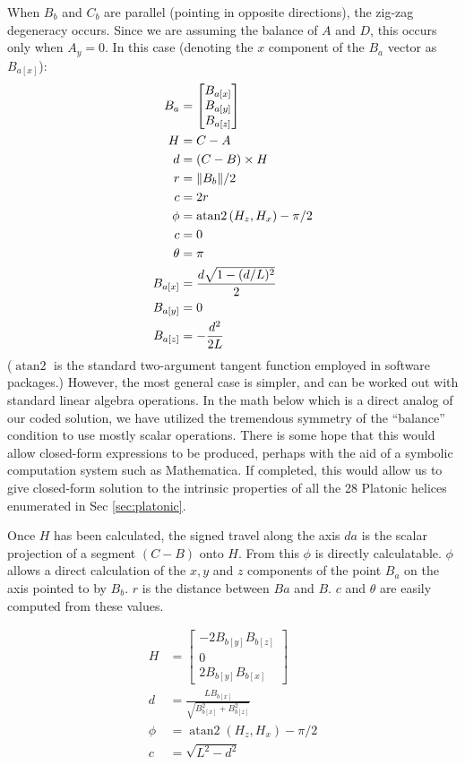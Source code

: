 \documentclass[11pt]{article}
\DeclarePairedDelimiter{\norm}{\lVert}{\rVert}
\DeclareMathOperator{\atantwo}{atan2}
\begin{document}
{When $B_b$ and $C_b$ are parallel (pointing in opposite directions),
the zig-zag degeneracy occurs. Since we are assuming
the balance of $A$ and $D$, this occurs only when $A_y = 0$.
In this case (denoting the $x$ component of the $B_a$ vector as $B_{a[x]}$):
\begin{align}
  B_{a} &= \begin{bmatrix} B_{a[x]} \\ B_{a[y]} \\ B_{a[z]}  \end{bmatrix} \\
  H &=  C - A \\
  d &= (C - B) \times H \\
  r &= \norm{B_b} / 2 \\
  c &= 2 r\\
  \phi &= \atantwo{(H_z,H_x)} - \pi/2 \\
  c &= 0 \\
  \theta &= \pi \\
  B_{a[x]} &= \frac{d\sqrt{1 - (d/L)^2}}{2} \\
  B_{a[y]} &= 0 \\
  B_{a[z]} &= -\frac{d^2}{2L} \\
\end{align}
($\atantwo$ is the standard two-argument tangent function employed in software packages.)
However, the most general case is simpler, and can be worked
out with standard linear algebra operations. In the math below
which is a direct analog of our coded solution, we have
utilized the tremendous symmetry of the ``balance'' condition
to use mostly scalar operations. There is some hope that
this would allow closed-form expressions to be produced, perhaps
with the aid of a symbolic computation system such as
Mathematica\cite{Mathematica}. If completed, this would
allow us to give closed-form solution to the intrinsic properties
of all the 28 Platonic helices enumerated in Sec \ref{sec:platonic}.

Once $H$ has been calculated, the signed travel along the axis $da$ is
the scalar projection of a segment $(C - B)$ onto $H$.
From this $\phi$ is directly calculatable. $\phi$ allows
a direct calculation of the $x,y$ and $z$ components of the
point $B_a$ on the axis pointed to by $B_b$.
$r$ is the distance between $Ba$ and $B$. $c$ and $\theta$
are easily computed from these values.

\begin{align}
  H &=  \begin{bmatrix} -2 B_{b[y]} B_{b[z]} \\ 0 \\ 2 B_{b[y]} B_{b[x]}  \end{bmatrix} \\
  d &= \frac{L B_{b[x]}}{\sqrt{B_{b[x]}^2 + B_{b[z]}^2}}  \\
  \phi &= \atantwo{(H_z,H_x)} - \pi/2  \\
  c &= \sqrt{L^2 - d^2}
\end{align}

}
\end{document}
